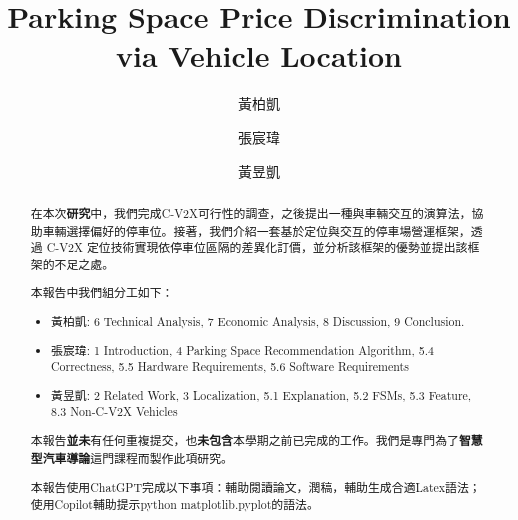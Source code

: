 \documentclass[sigconf,authorversion,nonacm,screen]{acmart}
\begin{document}
\title{Parking Space Price Discrimination via Vehicle Location}


\author{黃柏凱}

\author{張宸瑋}

\author{黃昱凱}


\renewcommand{\shortauthors}{}

\begin{abstract}

\quad 在本次\textbf{研究}中，我們完成C-V2X可行性的調查，之後提出一種與車輛交互的演算法，協助車輛選擇偏好的停車位。接著，我們介紹一套基於定位與交互的停車場營運框架，透過 C-V2X 定位技術實現依停車位區隔的差異化訂價，並分析該框架的優勢並提出該框架的不足之處。

本報告中我們組分工如下：
\begin{itemize}
    \item 黃柏凱: 6 Technical Analysis, 7 Economic Analysis, 8 Discussion, 9 Conclusion.
    \item 張宸瑋: 1 Introduction, 4 Parking Space Recommendation Algorithm, 5.4 Correctness, 5.5 Hardware Requirements, 5.6 Software Requirements
    \item 黃昱凱: 2 Related Work, 3 Localization, 5.1 Explanation, 5.2 FSMs, 5.3 Feature, 8.3 Non-C-V2X Vehicles
\end{itemize}

本報告\textbf{並未}有任何重複提交，也\textbf{未包含}本學期之前已完成的工作。我們是專門為了\textbf{智慧型汽車導論}這門課程而製作此項研究。

本報告使用ChatGPT完成以下事項：輔助閱讀論文，潤稿，輔助生成合適Latex語法；使用Copilot輔助提示python matplotlib.pyplot的語法。
\end{abstract}
\end{document}

